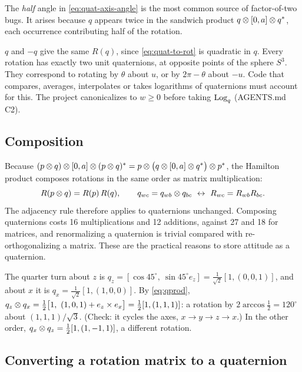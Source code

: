The \emph{half} angle in \eqref{eq:quat-axis-angle} is the most common source of factor-of-two bugs. It arises because $q$ appears twice in the
sandwich product $q \otimes [0,a] \otimes q^*$, each occurrence contributing half of the rotation.

\begin{keyidea}
$q$ and $-q$ give the same $R(q)$, since \eqref{eq:quat-to-rot} is quadratic in $q$. Every rotation has exactly two unit quaternions, at opposite
points of the sphere $S^3$. They correspond to rotating by $\theta$ about $u$, or by $2\pi - \theta$ about $-u$. Code that compares, averages,
interpolates or takes logarithms of quaternions must account for this. The project canonicalizes to $w \ge 0$ before taking $\operatorname{Log}_q$
(AGENTS.md C2).
\end{keyidea}

\subsection{Composition}

Because $(p\otimes q)\otimes[0, a]\otimes(p\otimes q)^* = p\otimes\big(q\otimes[0, a]\otimes q^*\big)\otimes p^*$, the Hamilton product composes rotations in the same order
as matrix multiplication:
\begin{equation}
  R(p \qprod q) = R(p)\,R(q), \qquad q_{wc} = q_{wb}\qprod q_{bc} \ \leftrightarrow\ R_{wc} = R_{wb}R_{bc}.
\end{equation}
The adjacency rule therefore applies to quaternions unchanged. Composing quaternions costs 16 multiplications and 12 additions, against 27 and
18 for matrices, and renormalizing a quaternion is trivial compared with re-orthogonalizing a matrix. These are the practical reasons to
store attitude as a quaternion.

\begin{worked}
The quarter turn about $z$ is $q_z = [\cos45^\circ,\ \sin45^\circ e_z] = \frac{1}{\sqrt2}[1, (0,0,1)]$, and about $x$ it is
$q_x = \frac{1}{\sqrt2}[1, (1,0,0)]$. By \eqref{eq:qprod}, $q_z\otimes q_x = \tfrac12\big[1,\ (1, 0, 1) + e_z\times e_x\big] = \tfrac12[1, (1, 1, 1)]$: a rotation by
$2\arccos\frac12 = 120^\circ$ about $(1,1,1)/\sqrt3$. (Check: it cycles the axes, $x\to y\to z\to x$.) In the other order,
$q_x\otimes q_z = \tfrac12[1, (1, -1, 1)]$, a different rotation.
\end{worked}

\subsection{Converting a rotation matrix to a quaternion}

